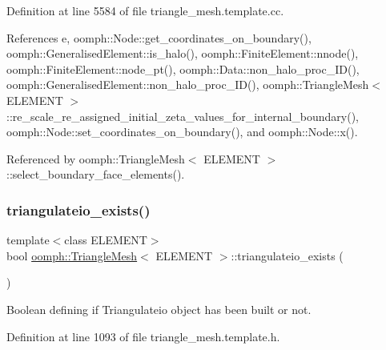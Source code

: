 Definition at line 5584 of file triangle\+\_\+mesh.\+template.\+cc.



References e, oomph\+::\+Node\+::get\+\_\+coordinates\+\_\+on\+\_\+boundary(), oomph\+::\+Generalised\+Element\+::is\+\_\+halo(), oomph\+::\+Finite\+Element\+::nnode(), oomph\+::\+Finite\+Element\+::node\+\_\+pt(), oomph\+::\+Data\+::non\+\_\+halo\+\_\+proc\+\_\+\+I\+D(), oomph\+::\+Generalised\+Element\+::non\+\_\+halo\+\_\+proc\+\_\+\+I\+D(), oomph\+::\+Triangle\+Mesh$<$ E\+L\+E\+M\+E\+N\+T $>$\+::re\+\_\+scale\+\_\+re\+\_\+assigned\+\_\+initial\+\_\+zeta\+\_\+values\+\_\+for\+\_\+internal\+\_\+boundary(), oomph\+::\+Node\+::set\+\_\+coordinates\+\_\+on\+\_\+boundary(), and oomph\+::\+Node\+::x().



Referenced by oomph\+::\+Triangle\+Mesh$<$ E\+L\+E\+M\+E\+N\+T $>$\+::select\+\_\+boundary\+\_\+face\+\_\+elements().

\mbox{\label{classoomph_1_1TriangleMesh_ae363c369eaae0841ec326cb8f6752550}} 
\subsubsection{\texorpdfstring{triangulateio\+\_\+exists()}{triangulateio\_exists()}}
{\footnotesize\ttfamily template$<$class E\+L\+E\+M\+E\+NT$>$ \\
bool \hyperlink{classoomph_1_1TriangleMesh}{oomph\+::\+Triangle\+Mesh}$<$ E\+L\+E\+M\+E\+NT $>$\+::triangulateio\+\_\+exists (\begin{DoxyParamCaption}{ }\end{DoxyParamCaption})\hspace{0.3cm}{\ttfamily [inline]}}



Boolean defining if Triangulateio object has been built or not. 



Definition at line 1093 of file triangle\+\_\+mesh.\+template.\+h.

\mbox{\label{classoomph_1_1TriangleMesh_ae03156e70bf50cf8a600e2046bdbe3c3}} 
